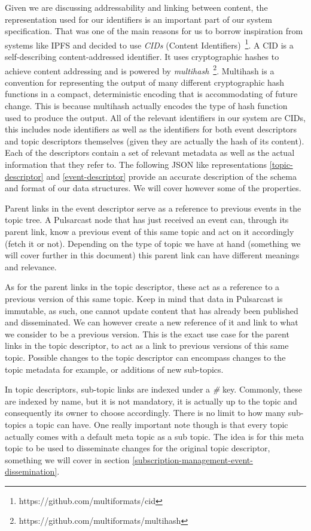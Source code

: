 Given we are discussing addressability and linking between content, the
representation used for our identifiers is an important part of our system
specification. That was one of the main reasons for us to borrow inspiration
from systems like IPFS and decided to use \emph{CIDs} (Content
Identifiers)~\footnote{https://github.com/multiformats/cid}.  A CID is a
self-describing content-addressed identifier. It uses cryptographic hashes to
achieve content addressing and is powered by
\emph{multihash}~\footnote{https://github.com/multiformats/multihash}.
Multihash is a convention for representing the output of many different
cryptographic hash functions in a compact, deterministic encoding that is
accommodating of future change. This is because multihash actually encodes the
type of hash function used to produce the output. All of the relevant
identifiers in our system are CIDs, this includes node identifiers as well as
the identifiers for both event descriptors and topic descriptors themselves
(given they are actually the hash of its content). Each of the descriptors
contain a set of relevant metadata as well as the actual information that they
refer to. The following JSON like representations \ref{topic-descriptor} and
\ref{event-descriptor} provide an accurate description of the schema and format
of our data structures. We will cover however some of the properties.

Parent links in the event descriptor serve as a reference to previous events in
the topic tree. A Pulsarcast node that has just received an event can, through
its parent link, know a previous event of this same topic and act on it
accordingly (fetch it or not). Depending on the type of topic we have at hand
(something we will cover further in this document) this parent link can have
different meanings and relevance.

As for the parent links in the topic descriptor, these act as a reference to a
previous version of this same topic. Keep in mind that data in Pulsarcast is
immutable, as such, one cannot update content that has already been published
and disseminated. We can however create a new reference of it and link to what
we consider to be a previous version. This is the exact use case for the parent
links in the topic descriptor, to act as a link to previous versions of this
same topic. Possible changes to the topic descriptor can encompass changes to
the topic metadata for example, or additions of new sub-topics.

In topic descriptors, sub-topic links are indexed under a \emph{\#} key.
Commonly, these are indexed by name, but it is not mandatory, it is actually up
to the topic and consequently its owner to choose accordingly.  There is no
limit to how many sub-topics a topic can have. One really important note though is that every topic actually comes with a default meta topic as a sub topic. The idea is for this meta topic to be used to disseminate changes for the original topic descriptor, something we will cover in section \ref{subscription-management-event-dissemination}.

